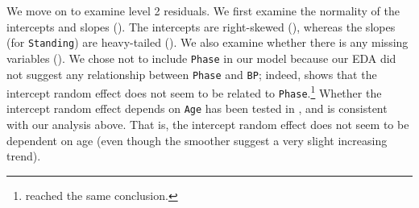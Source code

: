 \documentclass[12pt,twoside,letterpaper]{article}
\theoremstyle{definition}
\theoremstyle{definition}
\begin{document}
We move on to examine level 2 residuals. We first examine the normality of the intercepts and slopes (). The intercepts are right-skewed (), whereas the slopes (for \texttt{Standing}) are heavy-tailed (). We also examine whether there is any missing variables (). We chose not to include \texttt{Phase} in our model because our EDA did not suggest any relationship between \texttt{Phase} and \texttt{BP}; indeed,  shows that the intercept random effect does not seem to be related to \texttt{Phase}.\footnote{\citet[][~ p. 231]{goldstein_ambulatory_2000} reached the same conclusion.} Whether the intercept random effect depends on \texttt{Age} has been tested in , and  is consistent with our analysis above. That is, the intercept random effect does not seem to be dependent on age (even though the smoother suggest a very slight increasing trend).
\end{document}
